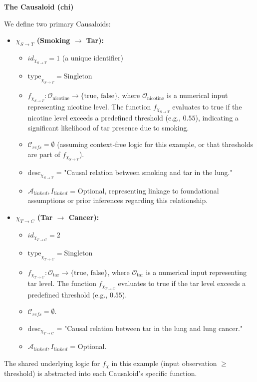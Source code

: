 \textbf{The Causaloid (chi)}
        
        We define two primary Causaloids:

        \begin{itemize}
            \item \textbf{\(\chi_{S \to T}\) (Smoking \(\rightarrow\) Tar):}
                \begin{itemize}
                    \item \(id_{\chi_{S \to T}} = 1\) (a unique identifier)
                    \item \(\text{type}_{\chi_{S \to T}} = \text{Singleton}\)
                    \item \(f_{\chi_{S \to T}}: \mathcal{O}_{\text{nicotine}} \to \{\text{true, false}\}\), where \(\mathcal{O}_{\text{nicotine}}\) is a numerical input representing nicotine level. The function \(f_{\chi_{S \to T}}\) evaluates to true if the nicotine level exceeds a predefined threshold (e.g., \(0.55\)), indicating a significant likelihood of tar presence due to smoking.
                    \item \(\mathcal{C}_{refs} = \emptyset\) (assuming context-free logic for this example, or that thresholds are part of \(f_{\chi_{S \to T}}\)).
                    \item \(\text{desc}_{\chi_{S \to T}}\) = "Causal relation between smoking and tar in the lung."
                    \item \(\mathcal{A}_{linked}, I_{linked}\) = Optional, representing linkage to foundational assumptions or prior inferences regarding this relationship.
                \end{itemize}
            \vspace{0.5em} 
            \item \textbf{\(\chi_{T \to C}\) (Tar \(\rightarrow\) Cancer):}
                \begin{itemize}
                    \item \(id_{\chi_{T \to C}} = 2\)
                    \item \(\text{type}_{\chi_{T \to C}} = \text{Singleton}\)
                    \item \(f_{\chi_{T \to C}}: \mathcal{O}_{\text{tar}} \to \{\text{true, false}\}\), where \(\mathcal{O}_{\text{tar}}\) is a numerical input representing tar level. The function \(f_{\chi_{T \to C}}\) evaluates to true if the tar level exceeds a predefined threshold (e.g., \(0.55\)).
                    \item \(\mathcal{C}_{refs} = \emptyset\).
                    \item \(\text{desc}_{\chi_{T \to C}}\) = "Causal relation between tar in the lung and lung cancer."
                    \item \(\mathcal{A}_{linked}, I_{linked}\) = Optional.
                \end{itemize}
        \end{itemize}
        The shared underlying logic for \(f_\chi\) in this example (input observation \(\ge\) threshold) is abstracted into each Causaloid's specific function.

